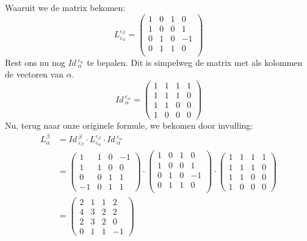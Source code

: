 \documentclass[lineaire_algebra_oplossingen.tex]{subfiles}
\begin{document}
Waaruit we de matrix bekomen:
\[L^{\varepsilon_\beta}_{\varepsilon_\alpha} = 
\begin{pmatrix}
1 & 0 & 1 & 0 \\ 
1 & 0 & 0 & 1 \\ 
0 & 1 & 0 & -1 \\ 
0 & 1 & 1 & 0 \\ 
\end{pmatrix}
\]
Rest ons nu nog $\textit{Id}\,^{\varepsilon_\alpha}_{\alpha}$ te bepalen. Dit is simpelweg de matrix met als kolommen de vectoren van $\alpha$.
\[\textit{Id}\,^{\varepsilon_\alpha}_{\alpha} =
\begin{pmatrix}
1 & 1 & 1 & 1 \\
1 & 1 & 1 & 0 \\
1 & 1 & 0 & 0 \\
1 & 0 & 0 & 0
\end{pmatrix}
\]
Nu, terug naar onze originele formule, we bekomen door invulling:
\begin{align*}
L^\beta_\alpha &=
\textit{Id}\,^\beta_{\varepsilon_\beta}\cdot L^{\varepsilon_\beta}_{\varepsilon_\alpha}\cdot \textit{Id}\,^{\varepsilon_\alpha}_{\alpha} \\
&=
\begin{pmatrix}
 1 & 1 & 0 & -1 \\
 1 & 1 & 0 &  0 \\
 0 & 0 & 1 &  1 \\
-1 & 0 & 1 &  1
\end{pmatrix}
\cdot
\begin{pmatrix}
1 & 0 & 1 & 0 \\ 
1 & 0 & 0 & 1 \\ 
0 & 1 & 0 & -1 \\ 
0 & 1 & 1 & 0 \\ 
\end{pmatrix}
\cdot
\begin{pmatrix}
1 & 1 & 1 & 1 \\
1 & 1 & 1 & 0 \\
1 & 1 & 0 & 0 \\
1 & 0 & 0 & 0
\end{pmatrix} \\
&=
\begin{pmatrix}
2 & 1 & 1 &  2 \\ 
4 & 3 & 2 &  2 \\ 
2 & 3 & 2 &  0 \\ 
0 & 1 & 1 & -1
\end{pmatrix}
\end{align*}
\end{document}
